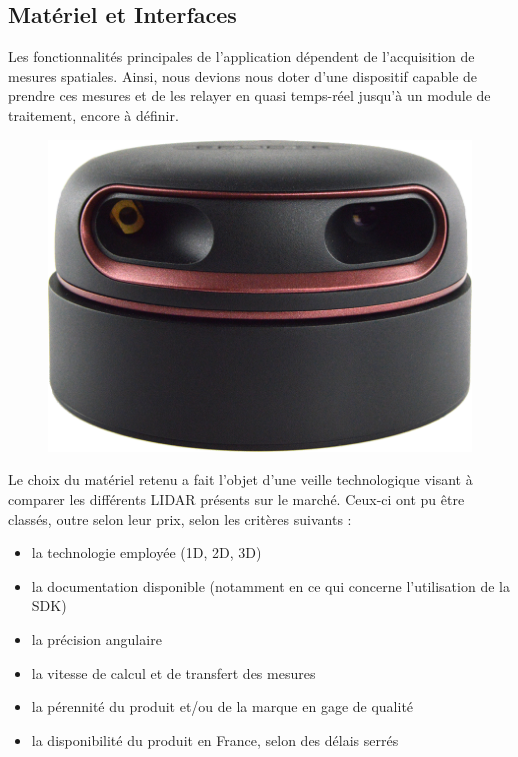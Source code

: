   \subsection{Matériel et Interfaces}
  \label{subsec:archi-physique}
  
Les fonctionnalités principales de l'application dépendent de l'acquisition de mesures spatiales. 
Ainsi, nous devions nous doter d'une dispositif capable de prendre ces mesures et de les relayer en quasi temps-réel jusqu'à un module de traitement, encore à définir. 

\begin{figure}[h]
  \centering
    \includegraphics[width=.2\linewidth]{figures/rplidar_a2}  
  \label{fig:rplidar}
\end{figure}

Le choix du matériel retenu a fait l'objet d'une veille technologique visant à comparer les différents \gls{LIDAR} présents sur le marché. 
Ceux-ci ont pu être classés, outre selon leur prix, selon les critères suivants : 

\begin{itemize}
  \item la technologie employée (1D, 2D, 3D)
  \item la documentation disponible (notamment en ce qui concerne l'utilisation de la \gls{SDK})
  \item la précision angulaire
  \item la vitesse de calcul et de transfert des mesures
  \item la pérennité du produit et/ou de la marque en gage de qualité
  \item la disponibilité du produit en France, selon des délais serrés
\end{itemize}

